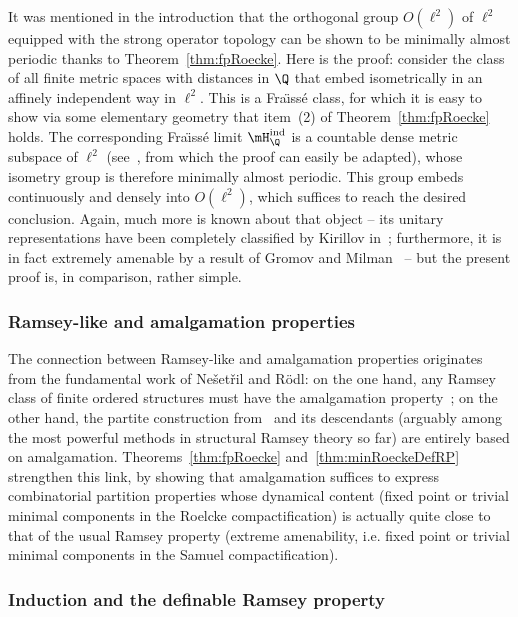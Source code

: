 It was mentioned in the introduction that the orthogonal group $O(\ell^{2})$ of $\ell^{2}$ equipped with the strong operator topology can be shown to be minimally almost periodic thanks to Theorem~\ref{thm:fpRoecke}. Here is the proof: consider the class of all finite metric spaces with distances in $\Q$ that embed isometrically in an affinely independent way in $\ell^{2}$. This is a Fra\"{\i}ss\'e class, for which it is easy to show via some elementary geometry that item~(2) of Theorem~\ref{thm:fpRoecke} holds. The corresponding Fra\"{\i}ss\'e limit $\mH_{\Q}^{\mathrm{ind}}$ is a countable dense metric subspace of $\ell^{2}$ (see~\cite[Chapter~1, Section~4.3]{NVT1}, from which the proof can easily be adapted), whose isometry group is therefore minimally almost periodic. This group embeds continuously and densely into $O(\ell^{2})$, which suffices to reach the desired conclusion. Again, much more is known about that object -- its unitary representations have been completely classified by Kirillov in~\cite{Ki}; furthermore, it is in fact extremely amenable by a result of Gromov and Milman~\cite{GM} -- but the present proof is, in comparison, rather simple.


\subsubsection{Ramsey-like and amalgamation properties}

The connection between Ramsey-like and amalgamation properties originates from the fundamental work of Ne\v set\v ril and R\"odl: on the one hand, any Ramsey class of finite ordered structures must have the amalgamation property~\cite{Ne1}; on the other hand, the partite construction from~\cite{NR2} and its descendants (arguably among the most powerful methods in structural Ramsey theory so far) are entirely based on amalgamation. Theorems~\ref{thm:fpRoecke} and~\ref{thm:minRoeckeDefRP} strengthen this link, by showing that amalgamation suffices to express combinatorial partition properties whose dynamical content (fixed point or trivial minimal components in the Roelcke compactification) is actually quite close to that of the usual Ramsey property (extreme amenability, i.e. fixed point or trivial minimal components in the Samuel compactification).

\subsubsection{Induction and the definable Ramsey property}

